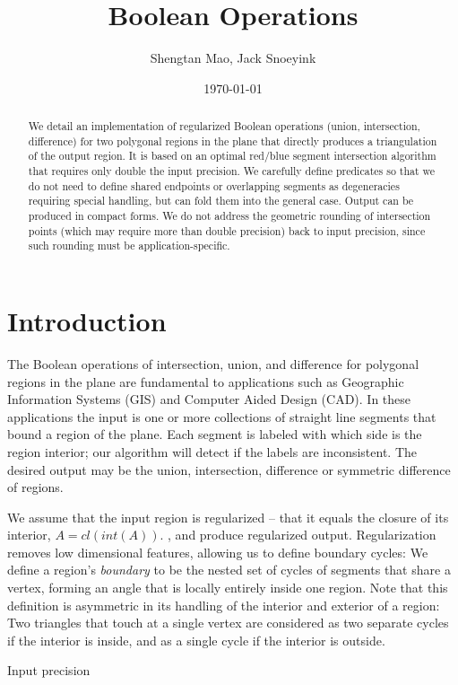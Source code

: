 \documentclass[11pt]{article}
\title{Boolean Operations}
\author{Shengtan Mao, Jack Snoeyink}
\date{\today}
\begin{document}
\maketitle
\begin{abstract}
We detail an implementation of regularized Boolean operations (union, intersection, difference) for two polygonal regions in the plane that directly produces a triangulation of the output region. 
It is based on an optimal red/blue segment intersection algorithm that requires only double the input precision.  
We carefully define predicates so that we do not need to define shared endpoints or overlapping segments as degeneracies requiring special handling, but can fold them into the general case.  
Output can be produced in compact forms.  
We do not address the geometric rounding of intersection points (which may require more than double precision) back to input precision, since such rounding must be application-specific.
\end{abstract}
\section{Introduction}

The Boolean operations of intersection, union, and difference for polygonal regions in the plane are fundamental to applications such as Geographic Information Systems (GIS)
and Computer Aided Design (CAD).  
In these applications the input is one or more collections of straight line segments that bound a region of the plane.
Each segment is labeled with which side is the region interior; our algorithm will detect if the labels are inconsistent.
The desired output may be the union, intersection, difference or symmetric difference of regions. 

We assume that the input region is regularized -- that it equals the closure of its interior, 
$A= \textit{cl}(\textit{int}(A))$. , and produce regularized output. 
Regularization removes low dimensional features, allowing us to define boundary cycles: 
We define a region's \textit{boundary} to be the nested set of cycles of segments that share a vertex, forming an angle that is locally entirely inside one region.
Note that this definition is asymmetric in its handling of the interior and exterior of a region:  Two triangles that touch at a single vertex are considered as two separate cycles if the interior is inside, and as a single cycle if the interior is outside.  

Input precision
\end{document}
